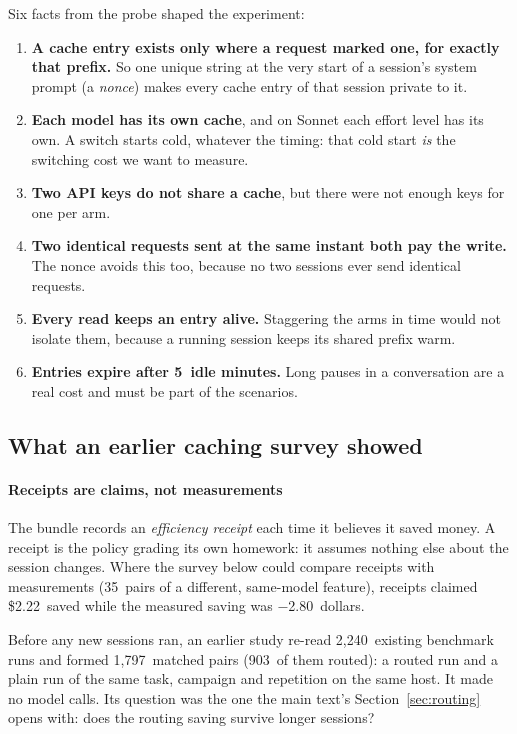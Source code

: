 \documentclass[11pt,letterpaper]{article}
\newcommand{\term}[1]{\emph{#1}}
\newcommand{\CacheTTLMin}{5}
\newcommand{\SurveyRcptClaimed}{2.22}
\newcommand{\SurveyRcptMeasured}{$-$2.80}
\newcommand{\SurveyRcptPairs}{35}
\newcommand{\CaPairs}{1{,}797}
\newcommand{\CaRoutedPairs}{903}
\newcommand{\CaRuns}{2{,}240}
\newcommand{\mainpaper}{the main text}\newcommand{\thissupp}{these appendices}\newcommand{\Thissupp}{These appendices}
\begin{document}
\begin{keyidea}
Six facts from the probe shaped the experiment:
\begin{enumerate}[leftmargin=1.4em]
  \item \textbf{A cache entry exists only where a request marked one, for exactly that prefix.} So one unique
    string at the very start of a session's system prompt (a \term{nonce}) makes every cache entry of that
    session private to it.
  \item \textbf{Each model has its own cache}, and on Sonnet each effort level has its own. A switch starts
    cold, whatever the timing: that cold start \emph{is} the switching cost we want to measure.
  \item \textbf{Two API keys do not share a cache}, but there were not enough keys for one per arm.
  \item \textbf{Two identical requests sent at the same instant both pay the write.} The nonce avoids this
    too, because no two sessions ever send identical requests.
  \item \textbf{Every read keeps an entry alive.} Staggering the arms in time would not isolate them, because
    a running session keeps its shared prefix warm.
  \item \textbf{Entries expire after \CacheTTLMin\ idle minutes.} Long pauses in a conversation are a
    real cost and must be part of the scenarios.
\end{enumerate}
\end{keyidea}
\subsection{What an earlier caching survey showed}\label{vt:sec:survey}

\paragraph{Receipts are claims, not measurements} The bundle records an \term{efficiency receipt} each time it
believes it saved money. A receipt is the policy grading its own homework: it assumes nothing else about the session
changes. Where the survey below could compare receipts with measurements (\SurveyRcptPairs\ pairs of a different,
same-model feature), receipts claimed \$\SurveyRcptClaimed\ saved while the measured saving was \SurveyRcptMeasured\
dollars.

Before any new sessions ran, an earlier study re-read \CaRuns\ existing benchmark runs and formed \CaPairs\
matched pairs (\CaRoutedPairs\ of them routed): a routed run and a plain run of the same task, campaign and
repetition on the same host. It made no model calls. Its question was the one \mainpaper{}'s Section~\ref{sec:routing} opens with: does the routing saving
survive longer sessions?
\end{document}
